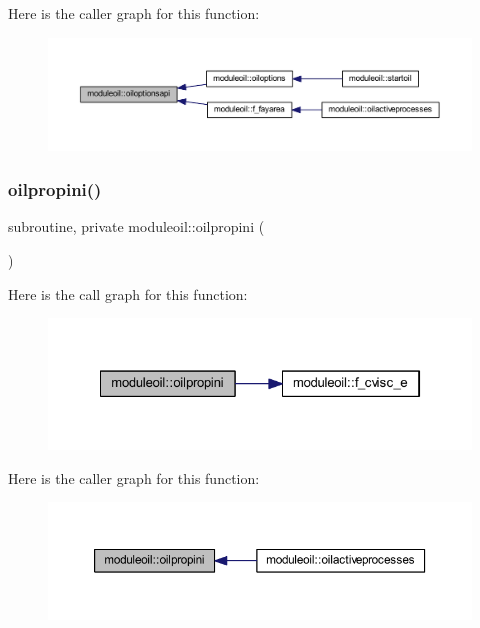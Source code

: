 Here is the caller graph for this function\+:\nopagebreak
\begin{figure}[H]
\begin{center}
\leavevmode
\includegraphics[width=350pt]{namespacemoduleoil_a25b9c130249a4691ccc1c06b3bae5a4e_icgraph}
\end{center}
\end{figure}
\mbox{\label{namespacemoduleoil_a11e04f321f0ebc3e9a379f908b8a0cd2}} 
\subsubsection{\texorpdfstring{oilpropini()}{oilpropini()}}
{\footnotesize\ttfamily subroutine, private moduleoil\+::oilpropini (\begin{DoxyParamCaption}{ }\end{DoxyParamCaption})\hspace{0.3cm}{\ttfamily [private]}}

Here is the call graph for this function\+:\nopagebreak
\begin{figure}[H]
\begin{center}
\leavevmode
\includegraphics[width=322pt]{namespacemoduleoil_a11e04f321f0ebc3e9a379f908b8a0cd2_cgraph}
\end{center}
\end{figure}
Here is the caller graph for this function\+:\nopagebreak
\begin{figure}[H]
\begin{center}
\leavevmode
\includegraphics[width=350pt]{namespacemoduleoil_a11e04f321f0ebc3e9a379f908b8a0cd2_icgraph}
\end{center}
\end{figure}
\mbox{\label{namespacemoduleoil_aaa3a2256f78ae25e941bfe7a937c796b}} 

